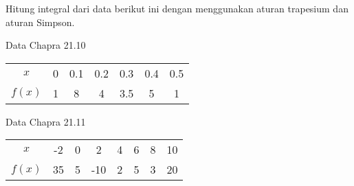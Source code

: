 \begin{soal}
    Hitung integral dari data berikut ini dengan menggunakan aturan trapesium dan aturan
    Simpson.
    
    Data Chapra 21.10
    
    {\centering
    \begin{tabular}{|c|cccccc|}
    \hline
    $x$    & 0 & 0.1 & 0.2 & 0.3 & 0.4 & 0.5 \\
    $f(x)$ & 1 & 8   & 4   & 3.5 & 5   & 1 \\
    \hline
    \end{tabular}
    \par}
    
    Data Chapra 21.11
    
    {\centering
    \begin{tabular}{|c|ccccccc|}
    \hline
    $x$    & -2 & 0 & 2 & 4 & 6 & 8 & 10 \\
    $f(x)$ & 35 & 5 & -10 & 2 & 5 & 3 & 20 \\
    \hline
    \end{tabular}
    \par}
    \end{soal}